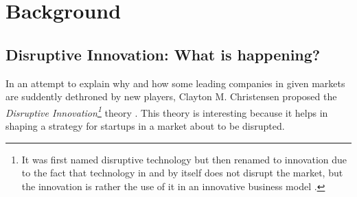 \documentclass[a4paper,10pt]{book}
\begin{document}

\newpage 

\section{Background}





\subsection{Disruptive Innovation: What is happening?}
In an attempt to explain why and how some leading companies in given markets are suddently dethroned by new players, 
Clayton M. Christensen proposed the \emph{Disruptive Innovation\footnote{It was first named disruptive technology but then renamed to innovation due 
  to the fact that technology in and by itself does not disrupt the market, but the innovation is rather the use of it in 
  an innovative business model \cite{scientificArticleDisruptiveInnovationBetterTheory}.}} 
theory \cite{innovatorsSolution}.
This theory is interesting because it helps in shaping a strategy for startups in a market about to be disrupted.
\\
\end{document}
